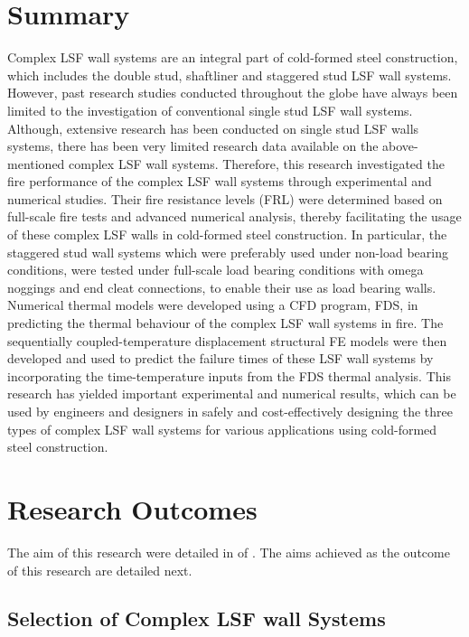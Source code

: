 \section{Summary}

Complex LSF wall systems are an integral part of cold-formed steel construction, which includes the double stud, shaftliner and staggered stud LSF wall systems. However, past research studies conducted throughout the globe have always been limited to the investigation of conventional single stud LSF wall systems. Although, extensive research has been conducted on single stud LSF walls systems, there has been very limited research data available on the above-mentioned complex LSF wall systems. Therefore, this research investigated the fire performance of the complex LSF wall systems through experimental and numerical studies. Their fire resistance levels (FRL) were determined based on full-scale fire tests and advanced numerical analysis, thereby facilitating the usage of these complex LSF walls in cold-formed steel construction. In particular, the staggered stud wall systems which were preferably used under non-load bearing conditions, were tested under full-scale load bearing conditions with omega noggings and end cleat connections, to enable their use as load bearing walls. Numerical thermal models were developed using a CFD program, FDS, in predicting the thermal behaviour of the complex LSF wall systems in fire. The sequentially coupled-temperature displacement structural FE models were then developed and used to predict the failure times of these LSF wall systems by incorporating the time-temperature inputs from the FDS thermal analysis. This research has yielded important experimental and numerical results, which can be used by engineers and designers in safely and cost-effectively designing the three types of complex LSF wall systems for various applications using cold-formed steel construction.

\section{Research Outcomes}

The aim of this research were detailed in  of . The aims achieved as the outcome of this research are detailed next.

\subsection{Selection of Complex LSF wall Systems}

